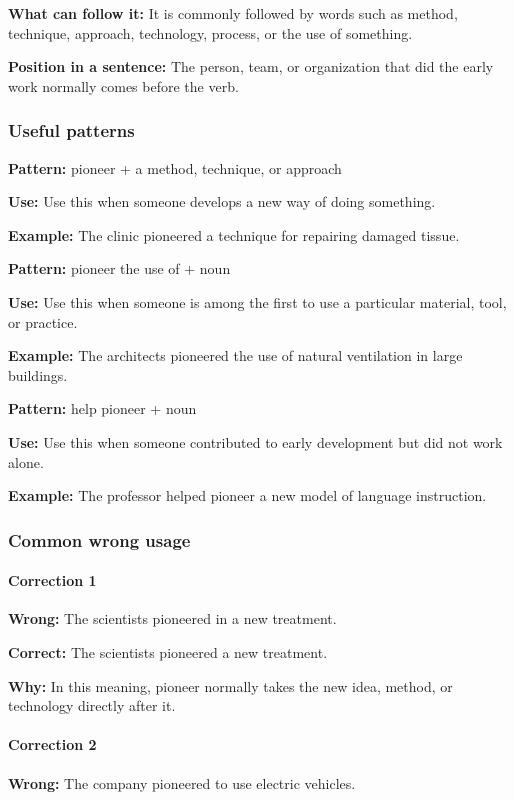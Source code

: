 \documentclass[11pt]{article}
\begin{document}
\textbf{What can follow it:} It is commonly followed by words such as method, technique, approach, technology, process, or the use of something.

\textbf{Position in a sentence:} The person, team, or organization that did the early work normally comes before the verb.

\subsubsection{Useful patterns}
\textbf{Pattern:} pioneer + a method, technique, or approach

\textbf{Use:} Use this when someone develops a new way of doing something.

\textbf{Example:} The clinic pioneered a technique for repairing damaged tissue.

\textbf{Pattern:} pioneer the use of + noun

\textbf{Use:} Use this when someone is among the first to use a particular material, tool, or practice.

\textbf{Example:} The architects pioneered the use of natural ventilation in large buildings.

\textbf{Pattern:} help pioneer + noun

\textbf{Use:} Use this when someone contributed to early development but did not work alone.

\textbf{Example:} The professor helped pioneer a new model of language instruction.

\subsubsection{Common wrong usage}
\paragraph{Correction 1}
\textbf{Wrong:} The scientists pioneered in a new treatment.

\textbf{Correct:} The scientists pioneered a new treatment.

\textbf{Why:} In this meaning, pioneer normally takes the new idea, method, or technology directly after it.

\paragraph{Correction 2}
\textbf{Wrong:} The company pioneered to use electric vehicles.
\end{document}
